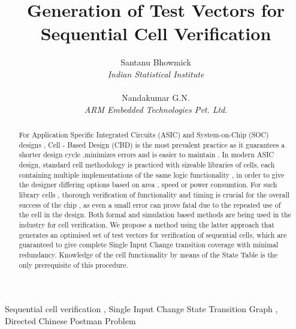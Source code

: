 \documentclass[final]{ieee}
\begin{document}
\title{Generation of Test Vectors for Sequential Cell Verification}
\author{Santanu Bhowmick \\ \textit{Indian Statistical Institute} \\ \\ Nandakumar G.N. \\ \textit{ARM Embedded Technologies Pvt. Ltd}.}
\maketitle

\begin{abstract}
For Application Specific Integrated Circuits (ASIC) and System-on-Chip (SOC) designs , Cell - Based Design (CBD) is the most prevalent practice as it guarantees a shorter design cycle ,minimizes errors and is easier to maintain . In modern ASIC design, standard cell methodology is practiced with sizeable libraries of cells, each containing multiple implementations of the same logic functionality , in order to give the designer differing options based on area , speed or power consumtion. For such library cells , thorough verification of functionality and timing is crucial for the overall success of the chip , as even a small error can prove fatal due to the repeated use of the cell in the design. Both formal and simulation based methods are being used in the industry for cell verification. We propose a method using the latter approach that generates an optimised set of test vectors for verification of sequential cells, which are guaranteed to give complete Single Input Change transition coverage with minimal redundancy. Knowledge of the cell functionality by means of the State Table is the only prerequisite of this procedure.
\end{abstract}

\begin{keywords}
Sequential cell verification , Single Input Change State Transition Graph , Directed Chinese Postman Problem
\end{keywords}
\end{document}
